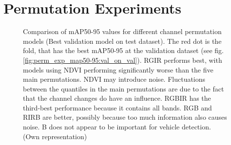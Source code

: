 \FloatBarrier

\section{Permutation Experiments}
\begin{figure}[t]
    \centering
    
    \caption[Comparison of \acrshort{mAP}50-95 values for different channel permutation models (Best validation model on test dataset)]{Comparison of \acrshort{mAP}50-95 values for different channel permutation models (Best validation model on test dataset). The red dot is the fold, that has the best \acrshort{mAP}50-95 at the validation dataset (see fig. \ref{fig:perm_exp_map50-95:val_on_val}). \acrshort{RGIR} performs best, with models using \acrshort{NDVI} performing significantly worse than the five main permutations. \acrshort{NDVI} may introduce noise. Fluctuations between the quantiles in the main permutations are due to the fact that the channel changes do have an influence. \acrshort{RGBIR} has the third-best performance because it contains all bands. \acrshort{RGB} and \acrshort{RIRB} are better, possibly because too much information also causes noise. \Acrlong{B} does not appear to be important for vehicle detection. (Own representation)}
    \label{fig:perm_exp_map50-95:val_on_test}
\end{figure}

